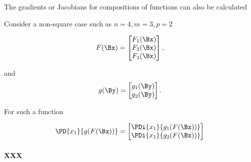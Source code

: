 The gradients or Jacobians for compositions of functions can also be calculated


Consider a non-square case such as \( n = 4, m = 3, p = 2 \)

\begin{dmath}\label{eqn:calculus:n}
F(\Bx) = 
\begin{bmatrix}
F_1(\Bx) \\
F_2(\Bx) \\
F_3(\Bx) \\
\end{bmatrix},
\end{dmath}

and
\begin{dmath}\label{eqn:calculus:n}
g(\By) 
=
\begin{bmatrix}
g_1(\By) \\
g_2(\By) \\
\end{bmatrix}.
\end{dmath}

For such a function

\begin{dmath}\label{eqn:calculus:n}
\PD{x_1}{g(F(\Bx))}
=
\begin{bmatrix}
\PDi{x_1}{g_1(F(\Bx))} \\
\PDi{x_1}{g_2(F(\Bx))}
\end{bmatrix}
\end{dmath}

\paragraph{XXX}

